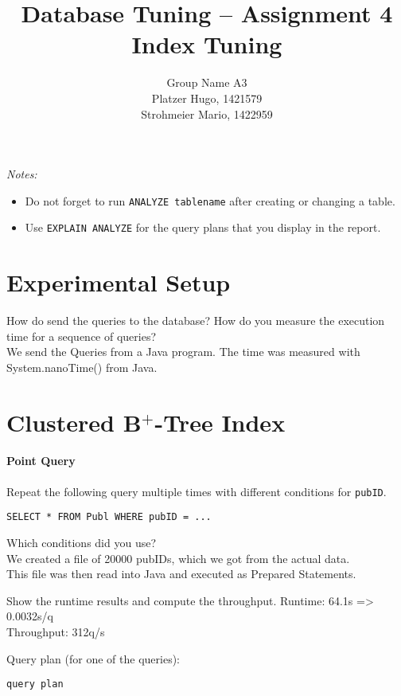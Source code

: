 \documentclass[11pt]{scrartcl}
\title{
  \textbf{\large Database Tuning -- Assignment 4}\\
  Index Tuning
}
\author{
 Group Name A3\\
 \large Platzer Hugo, 1421579 \\
 \large Strohmeier Mario, 1422959 \\
}
\begin{document}
\maketitle

\noindent
{\it Notes:}
\begin{itemize}\itemsep=0pt
\item Do not forget to run {\tt ANALYZE tablename} after creating or
  changing a table.
\item Use {\tt EXPLAIN ANALYZE} for the query plans that you display in the report.
\end{itemize}


\section{Experimental Setup}

How do send the queries to the database? How do you measure the
execution time for a sequence of queries?\\
We send the Queries from a Java program. The time was measured with System.nanoTime() from Java.

\section{Clustered B$^+$-Tree Index}

\paragraph{Point Query}

Repeat the following query multiple times with different conditions for {\tt pubID}.

{\small
\begin{verbatim}
SELECT * FROM Publ WHERE pubID = ...
\end{verbatim}
}

\noindent
Which conditions did you use?\\
We created a file of 20000 pubIDs, which we got from the actual data.\\
This file was then read into Java and executed as Prepared Statements.

\smallskip\noindent
Show the runtime results and compute the throughput.
Runtime: 64.1s => 0.0032s/q\\
Throughput: 312q/s

\smallskip\noindent
Query plan (for one of the queries):
{\small
\begin{verbatim}
query plan
\end{verbatim}
}
\end{document}
